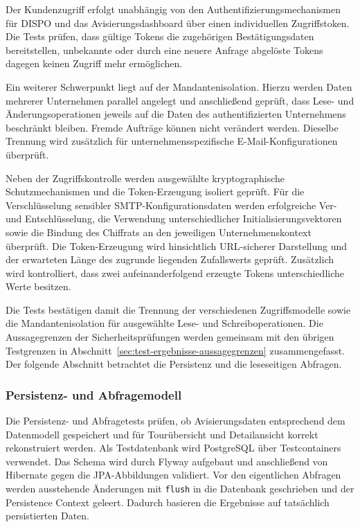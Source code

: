 Der Kundenzugriff erfolgt unabhängig von den Authentifizierungsmechanismen für
DISPO und das Avisierungsdashboard über einen individuellen Zugriffstoken. Die
Tests prüfen, dass gültige Tokens die zugehörigen Bestätigungsdaten bereitstellen,
unbekannte oder durch eine neuere Anfrage abgelöste Tokens dagegen keinen Zugriff
mehr ermöglichen.

Ein weiterer Schwerpunkt liegt auf der Mandantenisolation. Hierzu werden Daten
mehrerer Unternehmen parallel angelegt und anschließend geprüft, dass Lese- und
Änderungsoperationen jeweils auf die Daten des authentifizierten Unternehmens
beschränkt bleiben. Fremde Aufträge können nicht verändert werden. Dieselbe
Trennung wird zusätzlich für unternehmensspezifische E-Mail-Konfigurationen
überprüft.

Neben der Zugriffskontrolle werden ausgewählte kryptographische
Schutzmechanismen und die Token-Erzeugung isoliert geprüft. Für die
Verschlüsselung sensibler SMTP-Konfigurationsdaten werden erfolgreiche Ver- und
Entschlüsselung, die Verwendung unterschiedlicher Initialisierungsvektoren sowie
die Bindung des Chiffrats an den jeweiligen Unternehmenskontext überprüft. Die
Token-Erzeugung wird hinsichtlich URL-sicherer Darstellung und der erwarteten
Länge des zugrunde liegenden Zufallswerts geprüft. Zusätzlich wird kontrolliert,
dass zwei aufeinanderfolgend erzeugte Tokens unterschiedliche Werte besitzen.

Die Tests bestätigen damit die Trennung der verschiedenen Zugriffsmodelle sowie
die Mandantenisolation für ausgewählte Lese- und Schreiboperationen. Die
Aussagegrenzen der Sicherheitsprüfungen werden gemeinsam mit den übrigen
Testgrenzen in Abschnitt~\ref{sec:test-ergebnisse-aussagegrenzen}
zusammengefasst. Der folgende Abschnitt betrachtet die Persistenz und die
leseseitigen Abfragen.

\subsubsection{Persistenz- und Abfragemodell}
\label{sec:test-persistenz-abfragemodell}

Die Persistenz- und Abfragetests prüfen, ob Avisierungsdaten entsprechend dem
Datenmodell gespeichert und für Tourübersicht und Detailansicht korrekt
rekonstruiert werden. Als Testdatenbank wird PostgreSQL über Testcontainers
verwendet. Das Schema wird durch Flyway aufgebaut und anschließend von
Hibernate gegen die JPA-Abbildungen validiert. Vor den eigentlichen Abfragen
werden ausstehende Änderungen mit \texttt{flush} in die Datenbank geschrieben
und der Persistence Context geleert. Dadurch basieren die Ergebnisse auf
tatsächlich persistierten Daten.

